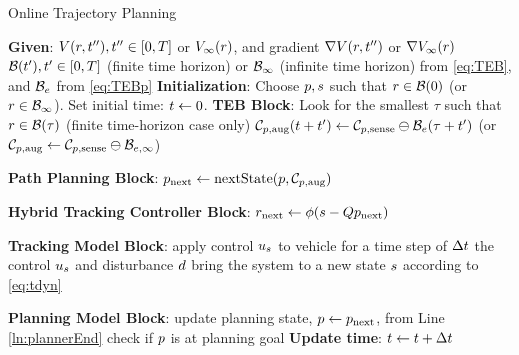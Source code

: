 \begin{algorithm}	
	\caption{Online Trajectory Planning}
	\label{alg:algOnline}
	\begin{algorithmic}[1]
		\STATE \textbf{Given}: \label{ln:gStart}
		\STATE $V(r, t''), t'' \in [0, T]$ or $V_\infty(r)$, and gradient $\nabla V(r, t'')$ or $\nabla V_\infty(r)$
 		\STATE $\mathcal B(t'), t' \in [0,T]$ (finite time horizon) or $\mathcal B_\infty$ (infinite time horizon) from \eqref{eq:TEB}, and $\mathcal B_e$ from \eqref{eq:TEBp} \label{ln:gEnd}
    \STATE \textbf{Initialization}: \label{ln:Istart}
		\STATE Choose $p, s$ such that $r \in \mathcal B(0)$ (or $r\in\mathcal B_\infty$).
    \STATE Set initial time: $t \leftarrow 0$. \label{ln:Iend}
		\STATE \textbf{TEB Block}: \label{ln:obsStart}
    \STATE Look for the smallest $\tau$ such that $r \in \mathcal B(\tau)$ (finite time-horizon case only)
		\STATE $\mathcal C_{p,\text{aug}}(t + t') \leftarrow \mathcal C_{p,\text{sense}} \ominus \mathcal B_e(\tau + t')$ \label{ln:obsEnd}
    \STATE (or $\mathcal C_{p,\text{aug}} \leftarrow \mathcal C_{p,\text{sense}} \ominus \mathcal B_{e, \infty}$) 
		
		\STATE \textbf{Path Planning Block}:\label{ln:plannerStart}
		\STATE $p_\text{next} \leftarrow \text{nextState}(p, \mathcal C_{p,\text{aug}})$\label{ln:plannerEnd}
		
		\STATE \textbf{Hybrid Tracking Controller Block}:\label{ln:controllerStart}
		\STATE $r_\text{next} \leftarrow \phi(s - Qp_\text{next})$
		
		\ELSE {} 
           \ENDIF \label{ln:controllerEnd}
		
		\STATE \textbf{Tracking Model Block}: \label{ln:trackingStart}
		\STATE apply control $u_s$ to vehicle for a time step of $\Delta t$
    \STATE the control $u_s$ and disturbance $d$ bring the system to a new state $s$ according to \eqref{eq:tdyn} \label{ln:trackingEnd}
		
		\STATE \textbf{Planning Model Block}:\label{ln:planningStart}
		\STATE update planning state, $p \leftarrow p_\text{next}$, from Line \ref{ln:plannerEnd}
		\STATE check if $p$ is at planning goal \label{ln:planningEnd}
    \STATE \textbf{Update time}:
    \STATE $t \leftarrow t + \Delta t$
		\ENDWHILE
	\end{algorithmic}
\end{algorithm}
